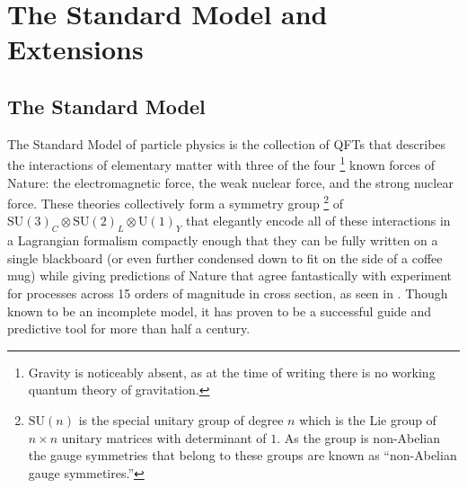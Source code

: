 \chapter{The Standard Model and Extensions}\label{chapter:theory}

\section{The Standard Model}\label{section:standard_model}

The Standard Model of particle physics is the collection of \glspl{QFT} that describes the interactions of elementary matter with three of the four%
\footnote{Gravity is noticeably absent, as at the time of writing there is no working quantum theory of gravitation.}
known forces of Nature: the electromagnetic force, the weak nuclear force, and the strong nuclear force.
These theories collectively form a symmetry group%
\footnote{$\mathrm{SU}(n)$ is the special unitary group of degree $n$ which is the Lie group  of $n\times n$ unitary matrices with determinant of $1$.
 As the group is non-Abelian the gauge symmetries that belong to these groups are known as ``non-Abelian gauge symmetires.''}
of $\mathrm{SU}(3)_{C} \otimes \mathrm{SU}(2)_{L} \otimes \mathrm{U}(1)_{Y}$ that elegantly encode all of these interactions in a Lagrangian formalism compactly enough that they can be fully written on a single blackboard (or even further condensed down to fit on the side of a coffee mug) while giving predictions of Nature that agree fantastically with experiment for processes across 15 orders of magnitude in cross section, as seen in .
Though known to be an incomplete model, it has proven to be a successful guide and predictive tool for more than half a century.


